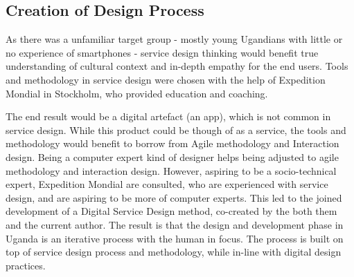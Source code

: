 


\subsection{Creation of Design Process}
As there was a unfamiliar target group - mostly young Ugandians with little or no experience of smartphones - service design thinking would benefit true understanding of cultural context and in-depth empathy for the end users. Tools and methodology in service design were chosen with the help of Expedition Mondial in Stockholm, who provided education and coaching.

The end result would be a digital artefact (an app), which is not common in service design. While this product could be though of as a service, the tools and methodology would benefit to borrow from Agile methodology and Interaction design. Being a computer expert kind of designer \citep{lowgren} helps being adjusted to agile methodology and interaction design. However, aspiring to be a socio-technical expert, Expedition Mondial are consulted, who are experienced with service design, and are aspiring to be more of computer experts. This led to the joined development of a Digital Service Design method, co-created by the both them and the current author. The result is that the design and development phase in Uganda is an iterative process with the human in focus. The process is built on top of service design process and methodology, while in-line with digital design practices.



